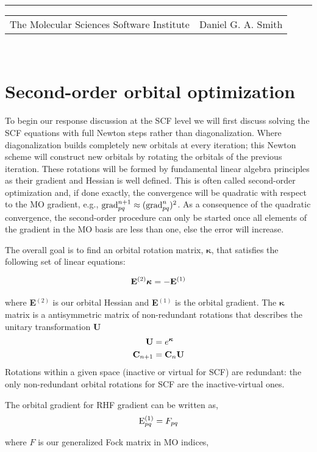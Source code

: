 \documentclass[aip,jcp,preprint,superscriptaddress,floatfix]{revtex4-1}
\renewcommand{\title}[1]{\textbf{\large{#1}}\\}
\newcommand{\leftright}[2]{\begin{tabularx}{\textwidth}{X>{\raggedleft}X}#1%
& #2\\\end{tabularx}\\[-1cm]}
\begin{document}
\title{}
\rule{\textwidth}{1pt}
\leftright{The Molecular Sciences Software Institute}{Daniel G. A. Smith} %

\bigskip
\section{Second-order orbital optimization}
To begin our response discussion at the SCF level we will first discuss solving the SCF equations with full Newton steps rather than diagonalization.
Where diagonalization builds completely new orbitals at every iteration; this Newton scheme will construct new orbitals by rotating the orbitals of the previous iteration.
These rotations will be formed by fundamental linear algebra principles as their gradient and Hessian is well defined.
This is often called second-order optimization and, if done exactly, the convergence will be quadratic with respect to the MO gradient\cite{Helgaker:2000ug}, e.g., ${\rm grad}_{pq}^{n+1} \approx ({{\rm grad}_{pq}^{n}}) ^2$.
As a consequence of the quadratic convergence, the second-order procedure can only be started once all elements of the gradient in the MO basis are less than one, else the error will increase. 

The overall goal is to find an orbital rotation matrix, ${\bm \kappa}$, that satisfies the following set of linear equations:

\begin{eqnarray}
\label{somcscf_master}
{\rm\bf E}^{(2)} {\bm \kappa} = -{\rm\bf E}^{(1)}
\end{eqnarray}

where {\bf E}$^{(2)}$ is our orbital Hessian and {\bf E}$^{(1)}$ is the orbital gradient. 
The ${\bm \kappa}$ matrix is a antisymmetric matrix of non-redundant rotations that describes the unitary transformation {\bf U}
\begin{align}
 {\rm\bf U} &= e^{\bm \kappa}\\
 {\rm\bf C}_{n+1} &= {\rm\bf C}_{n}{\rm\bf U}
\end{align}
Rotations within a given space (inactive or virtual for SCF) are redundant: the only non-redundant orbital rotations for SCF are the inactive-virtual ones.

The orbital gradient for RHF gradient can be written as,
\begin{eqnarray}
{\rm E}^{(1)}_{pq} = F_{pq}
\end{eqnarray}

where $F$ is our generalized Fock matrix\cite{Helgaker:2000ug} in MO indices,
\end{document}
